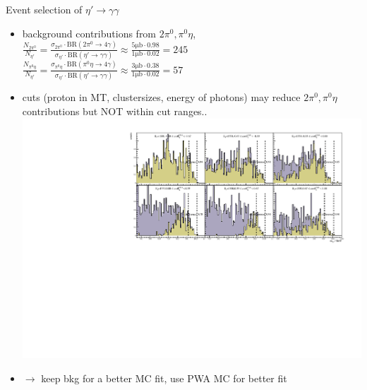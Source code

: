 \documentclass[11pt,aspectratio=169,dvipsnames]{beamer}
\newcommand{\thedate}{30th March 2022}
\begin{document}
	
	
\begin{frame}{Event selection of $\eta'\to\gamma\gamma$}
	\begin{itemize}
		\item background contributions from $2\pi^0,\pi^0\eta$, $\frac{N_{2\pi^0}}{N_{\eta'}}=\frac{\sigma_{2\pi^0}\cdot\text{BR}(2\pi^0\to4\gamma)}{\sigma_{\eta'}\cdot\text{BR}(\eta'\to\gamma\gamma)}\approx\frac{5\si{\micro\barn}\cdot0.98}{1\si{\micro\barn}\cdot0.02}=245$\\
		$\frac{N_{\pi^0\eta}}{N_{\eta'}}=\frac{\sigma_{\pi^0\eta}\cdot\text{BR}(\pi^0\eta\to4\gamma)}{\sigma_{\eta'}\cdot\text{BR}(\eta'\to\gamma\gamma)}\approx\frac{3\si{\micro\barn}\cdot0.38}{1\si{\micro\barn}\cdot0.02}=57$
		
		\item cuts (proton in MT, clustersizes, energy of photons) may reduce $2\pi^0,\pi^0\eta$ contributions but NOT within cut ranges..
		\includegraphics[width=.6\columnwidth]{../../figs/hydrogen/allcuts_2pi0.pdf}
		\item $\to$ keep bkg for a better MC fit, use PWA MC for better fit
	\end{itemize}
\end{frame}
\end{document}
